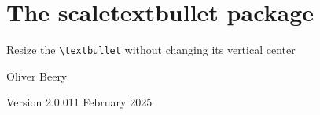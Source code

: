 \documentclass{article}
\begin{document}
\section*{\Large The \textsf{scaletextbullet} package}

Resize the \texttt{\textbackslash{}textbullet} without changing its vertical center

Oliver Beery

Version 2.0.0\quad{}11 February 2025

%
\end{document}
